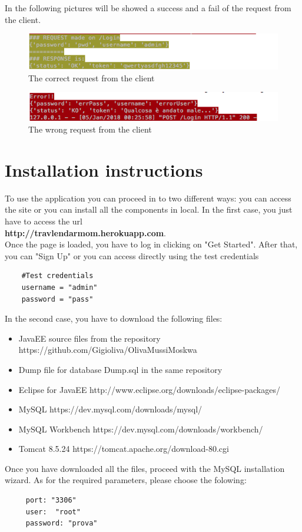 \documentclass[numbers=noenddot, 12pt, a4paper, oneside]{scrbook}
\begin{document}
In the following pictures will be showed a success and a fail of the request from the client.

\begin{figure}[H]
	\centering
	\includegraphics[width=1.1\textwidth]{Test/LoginSuccess}
	\caption{The correct request from the client}
\end{figure}

\begin{figure}[H]
	\centering
	\includegraphics[width=1.1\textwidth]{Test/LoginError}
	\caption{The wrong request from the client}
\end{figure}


\chapter{Installation instructions}

To use the application you can proceed in to two different ways: you can access the site or you can install all the components in local. In the first case, you just have to access the url\\

\textbf{http://travlendarmom.herokuapp.com}.\\

Once the page is loaded, you have to log in clicking on "Get Started". After that, you can "Sign Up" or you can access directly using the test credentials
\begin{lstlisting}
	#Test credentials
	username = "admin"
	password = "pass"
\end{lstlisting}

In the second case, you have to download the following files:
\begin{itemize}
	\item JavaEE source files from the repository https://github.com/Gigioliva/OlivaMussiMoskwa
	\item Dump file for database Dump.sql in the same repository
	\item Eclipse for JavaEE http://www.eclipse.org/downloads/eclipse-packages/
	\item MySQL https://dev.mysql.com/downloads/mysql/
	\item MySQL Workbench https://dev.mysql.com/downloads/workbench/
	\item Tomcat 8.5.24 https://tomcat.apache.org/download-80.cgi
\end{itemize}
Once you have downloaded all the files, proceed with the MySQL installation wizard. As for the required parameters, please choose the folowing:
\begin{lstlisting}
	 port: "3306"
	 user:  "root"
	 password: "prova"
\end{lstlisting}
\end{document}
